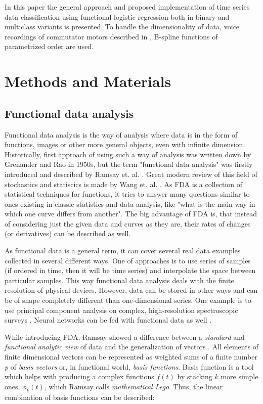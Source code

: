\documentclass[energies,article,submit,pdftex,moreauthors]{Definitions/mdpi}
\begin{document}
In this paper the general approach and proposed implementation of time series data classification using functional logistic regression both in binary and multiclass variants is presented. To handle the dimensionality of data, voice recordings of commutator motors described in \cite{ref-motors}, B-spline functions of parametrized order are used.


\section{Methods and Materials}
\subsection{Functional data analysis}
Functional data analysis is the way of analysis where data is in the form of functions, images or other more general objects, even with infinite dimension. Historically, first approach of using such a way of analysis was written down by Grenander \cite{grenander1950stochastic} and Rao \cite{rao1958some} in 1950s, but the term "functional data analysis" was firstly introduced and described by Ramsay et. al. \cite{ramsay-logreg, ramsay-logreg2, ramsay1982data}. Great modern review of this field of stochastics and statiscics is made by Wang et. al. \cite{wang2016functional}. As FDA is a collection of statistical techniques for functions, it tries to answer many questions similar to ones existing in classic statistics and data analysis, like "what is the main way in which one curve differs from another". The big advantage of FDA is, that instead of considering just the given data and curves as they are, their rates of changes (or derivatives) can be described as well.

As functional data is a general term, it can cover several real data examples collected in several different ways. One of approaches is to use series of samples (if ordered in time, then it will be time series) and interpolate the space between particular samples. This way functional data analysis deals with the finite resolution of physical devices. However, data can be stored in other ways and can be of shape completely different than one-dimensional series. One example is to use principal component analysis on complex, high-resolution spectroscopic surveys \cite{Patil_2022}. Neural networks can be fed with functional data as well \cite{rossi2005representation}.

While introducing FDA, Ramsay showed a difference between a \emph{standard} and \emph{functional analytic view} of data and the generalization of vectors \cite{ramsay1982data}. All elements of finite dimensional vectors can be represented as weighted sums of a finite number \emph{p} of \emph{basis vectors} or, in functional world, \emph{basis functions}. Basis function is a tool which helps with producing a complex functions $ f(t) $ by stacking $ k $ more simple ones, $ \phi_k(t) $, which Ramsay calls \emph{mathematical Lego}. Thus, the linear combination of basis functions can be described:
\end{document}
